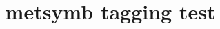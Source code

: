 \documentclass{article}
\title{metsymb tagging test}
\begin{document}
\zerookta

\fiveoktas
\oneokta
\sixoktas
\twooktas
\sevenoktas
\threeoktas
\eightoktas
\fouroktas

\chVI
\end{document}
